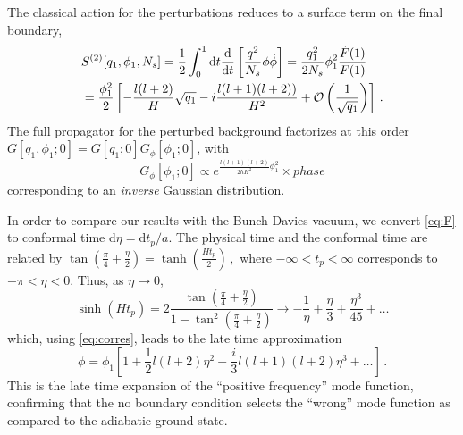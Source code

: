 \documentclass[twocolumn,amsmath,amssymb,superscriptaddress,nofootinbib]{revtex4-1}
\begin{document}
The classical action for the perturbations reduces to a surface term on the final boundary,
\begin{align*}
&S^{(2)}[q_1,\phi_1,N_s] 
= \frac{1}{2} \int_0^1 \mathrm{d}t \frac{\mathrm{d}}{\mathrm{d}t}\left[ \frac{q^2}{N_s} \phi \dot{\phi}\right]
 = \frac{q_1^2}{2N_s}\phi_1^2\frac{\dot{F}(1)}{F(1)} \nonumber \\ 
& = \frac{\phi_1^2}{2} \left[ -\frac{l(l+2)}{H} \sqrt{q_1} -i \frac{l(l+1)(l+2))}{H^2}+ {\cal O}\left(\frac{1}{\sqrt{q_1}}\right)\right]\,.\nonumber
\end{align*}
The full propagator for the perturbed background factorizes at this order $G[q_1,\phi_1;0]=G[q_1;0] G_\phi[\phi_1;0]$, with
\begin{equation}
G_\phi[\phi_1;0] \propto e^{\frac{l(l+1)(l+2)}{2\hbar H^2}\phi_1^2} \times phase \nonumber
\end{equation}
corresponding to an {\it inverse} Gaussian distribution. 

In order to compare our results with the Bunch-Davies vacuum, we convert \eqref{eq:F} to conformal time $\mathrm{d}\eta = \mathrm{d}t_p/a.$ The physical time and the conformal time are related by $\tan\left(\frac{\pi}{4} + \frac{\eta}{2}\right) = \tanh\left(\frac{H t_p}{2}\right)\,,$
where $-\infty < t_p < \infty$ corresponds to $-\pi < \eta < 0.$ Thus, as $\eta\rightarrow 0$,
\begin{equation}
\sinh(Ht_p) = 2 \frac{\tan(\frac{\pi}{4} + \frac{\eta}{2})}{1 - \tan^2(\frac{\pi}{4} + \frac{\eta}{2})} \rightarrow -\frac{1}{\eta} + \frac{\eta}{3} + \frac{\eta^3}{45} + \dots\nonumber
\end{equation}
which, using \eqref{eq:corres}, leads to the late time approximation
\begin{equation}
\phi = \phi_1 \left[ 1 + \frac{1}{2}l(l+2) \eta^2 - \frac{i}{3} l(l+1)(l+2) \eta^3 + \dots \right]\,. \nonumber
\end{equation}
This is the late time expansion of the ``positive frequency'' mode function, confirming that the no boundary condition selects the ``wrong'' mode function as compared to the adiabatic ground state. \\
\end{document}
